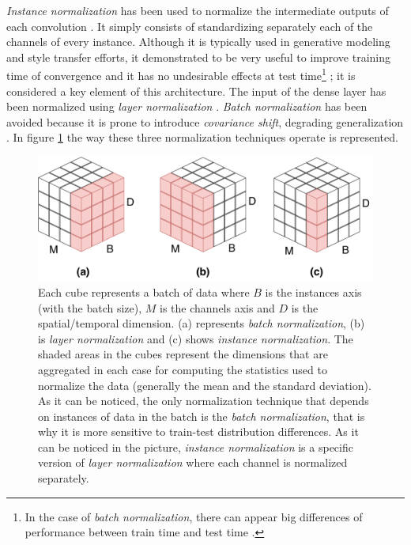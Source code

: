 \textit{Instance normalization}  has been used to normalize the intermediate outputs of each convolution \autocite{Ulyanov2016, Zheng2018}. It simply consists of standardizing separately each of the channels of every instance. Although it is typically used in generative modeling and style transfer efforts, it demonstrated to be very useful to improve training time of convergence and it has no undesirable effects at test time\footnote{In the case of \textit{batch normalization}, there can appear big differences of performance between train time and test time \autocite{Ba2016}.} \autocite{Ulyanov2016}; it is considered a key element of this architecture. The input of the dense layer has been normalized using \textit{layer normalization} \autocite{Ba2016}. \textit{Batch normalization} \autocite{ioffe2015} has been avoided because it is prone to introduce \textit{covariance shift}, degrading generalization \autocite{Ba2016}. In figure \ref{fig:normcubes} the way these three normalization techniques operate is represented.



\begin{figure}[ht]
	\centering
	\includegraphics[width=0.7\linewidth]{kws/images/normcubes}
	\caption[Batch, instance and layer normalization diagrams]{Each cube represents a batch of data where $B$ is the instances axis (with the batch size), $M$ is the channels axis and $D$ is the spatial/temporal dimension. (a) represents \textit{batch normalization}, (b) is \textit{layer normalization} and (c) shows \textit{instance normalization}. The shaded areas in the cubes represent the dimensions that are aggregated in each case for computing the statistics used to normalize the data (generally the mean and the standard deviation). As it can be noticed, the only normalization technique that depends on instances of data in the batch is the \textit{batch normalization}, that is why it is more sensitive to train-test distribution differences. As it can be noticed in the picture, \textit{instance normalization} is a specific version of \textit{layer normalization} where each channel is normalized separately.}
	\label{fig:normcubes}
\end{figure}




